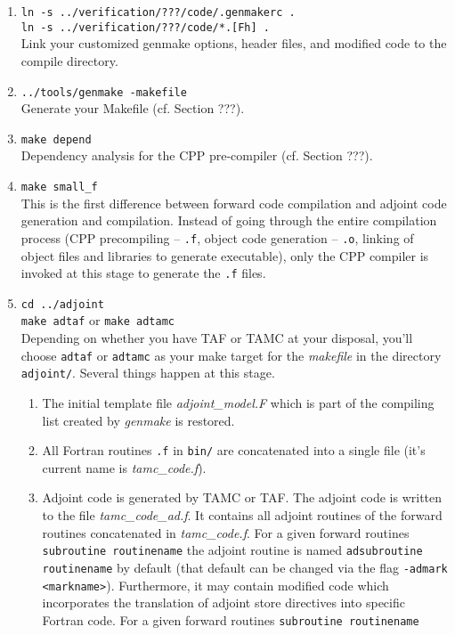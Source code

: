 \begin{enumerate}
%
\item
{\tt ln -s ../verification/???/code/.genmakerc .} \\
{\tt ln -s ../verification/???/code/*.[Fh] .} \\
Link your customized genmake options, header files,
and modified code to the compile directory.
%
\item
{\tt ../tools/genmake -makefile} \\
Generate your Makefile (cf. Section ???).
%
\item
{\tt make depend} \\
Dependency analysis for the CPP pre-compiler (cf. Section ???).
%
\item
{\tt make small\_f} \\
This is the first difference between forward code compilation
and adjoint code generation and compilation.
Instead of going through the entire compilation process
(CPP precompiling -- {\tt .f}, object code generation -- {\tt .o},
linking of object files and libraries to generate executable),
only the CPP compiler is invoked at this stage to generate
the {\tt .f} files.
%
\item
{\tt cd ../adjoint} \\
{\tt make adtaf} or {\tt make adtamc} \\
Depending on whether you have TAF or TAMC at your disposal,
you'll choose {\tt adtaf} or {\tt adtamc} as your
make target for the {\it makefile} in the directory {\tt adjoint/}.
Several things happen at this stage.
%
\begin{enumerate}
%
\item
The initial template file {\it adjoint\_model.F} which is part
of the compiling list created by {\it genmake} is restored.
%
\item
All Fortran routines {\tt *.f} in {\tt bin/} are 
concatenated into a single file (it's current name is 
{\it tamc\_code.f}).
%
\item
Adjoint code is generated by TAMC or TAF.
The adjoint code is written to the file {\it tamc\_code\_ad.f}.
It contains all adjoint routines of the forward routines
concatenated in {\it tamc\_code.f}.
For a given forward routines {\tt subroutine routinename}
the adjoint routine is named {\tt adsubroutine routinename}
by default (that default can be changed via the flag 
{\tt -admark <markname>}).
Furthermore, it may contain modified code which
incorporates the translation of adjoint store directives
into specific Fortran code.
For a given forward routines {\tt subroutine routinename}

\end{enumerate}
\end{enumerate}
